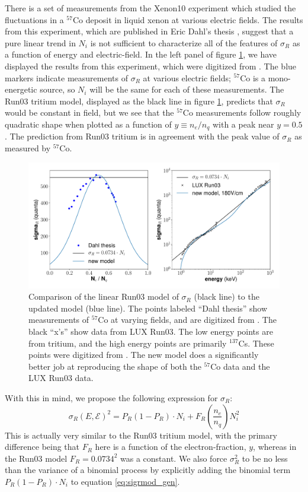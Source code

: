 There is a set of measurements from the Xenon10 experiment which studied the fluctuations in a $^{57}$Co deposit in liquid xenon at various electric fields. The results from this experiment, which are published in Eric Dahl's thesis \cite{dahl}, suggest that a pure linear trend in $N_i$ is not sufficient to characterize all of the features of $\sigma_R$ as a function of energy and electric-field. In the left panel of figure \ref{fig:sigR_wRun03pDahl}, we have displayed the results from this experiment, which were digitized from \cite{dahl}. The blue markers indicate measurements of $\sigma_R$ at various electric fields; $^{57}$Co is a mono-energetic source, so $N_i$ will be the same for each of these measurements. The Run03 tritium model, displayed as the black line in figure \ref{fig:sigR_wRun03pDahl}, predicts that $\sigma_R$ would be constant in field, but we see that the $^{57}$Co measurements follow roughly quadratic shape when plotted as a function of $y\equiv n_e/n_q$ with a peak near $y=0.5$. The prediction from Run03 tritium is in agreement with the peak value of $\sigma_R$ as measured by $^{57}$Co.
\begin{figure}[!h]
\centering
  \includegraphics[width=\textwidth]{Figures/sigR_wRun03pDahl_gfdcm.pdf}
\caption{Comparison of the linear Run03 model of $\sigma_R$ (black line) to the updated model (blue line). The points labeled ``Dahl thesis'' show measurements of $^{57}$Co at varying fields, and are digitized from \cite{dahl}. The black ``x's'' show data from LUX Run03. The low energy points are from tritium, and the high energy points are primarily $^{137}$Cs. These points were digitized from \cite{lux_tritium}. The new model does a significantly better job at reproducing the shape of both the $^{57}$Co data and the LUX Run03 data. }
\label{fig:sigR_wRun03pDahl}
\end{figure}

With this in mind, we propose the following expression for $\sigma_R$:
\begin{equation}\label{eq:sigrmod_gen}
\sigma_{R}(E,\mathcal{E})^2=P_{R}(1-P_{R})\cdot N_i +F_{R}(\frac{n_e}{n_q})N_i^2
\end{equation}
This is actually very similar to the Run03 tritium model, with the primary difference being that $F_R$ here is a function of the electron-fraction, $y$, whereas in the Run03 model $F_R=0.0734^2$ was a constant. We also force $\sigma_R^2$ to be no less than the variance of a binomial process by explicitly adding the binomial term $P_{R}(1-P_{R})\cdot N_i$ to equation \ref{eq:sigrmod_gen}.

